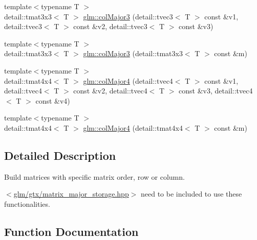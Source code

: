 \begin{DoxyCompactItemize}
\item 
{\footnotesize template$<$typename T $>$ }\\detail\+::tmat3x3$<$ T $>$ \hyperlink{group__gtx__matrix__major__storage_ga025bcabc88eafc950e2f518939dc154e}{glm\+::col\+Major3} (detail\+::tvec3$<$ T $>$ const \&v1, detail\+::tvec3$<$ T $>$ const \&v2, detail\+::tvec3$<$ T $>$ const \&v3)
\item 
{\footnotesize template$<$typename T $>$ }\\detail\+::tmat3x3$<$ T $>$ \hyperlink{group__gtx__matrix__major__storage_ga0766258f7e0ed0a64c38838011b8e4d8}{glm\+::col\+Major3} (detail\+::tmat3x3$<$ T $>$ const \&m)
\item 
{\footnotesize template$<$typename T $>$ }\\detail\+::tmat4x4$<$ T $>$ \hyperlink{group__gtx__matrix__major__storage_ga8f5575ea47a559564dc3bd073082e475}{glm\+::col\+Major4} (detail\+::tvec4$<$ T $>$ const \&v1, detail\+::tvec4$<$ T $>$ const \&v2, detail\+::tvec4$<$ T $>$ const \&v3, detail\+::tvec4$<$ T $>$ const \&v4)
\item 
{\footnotesize template$<$typename T $>$ }\\detail\+::tmat4x4$<$ T $>$ \hyperlink{group__gtx__matrix__major__storage_gad321af5ae6d151fd3752725b06c97154}{glm\+::col\+Major4} (detail\+::tmat4x4$<$ T $>$ const \&m)
\end{DoxyCompactItemize}


\subsection{Detailed Description}
Build matrices with specific matrix order, row or column. 

$<$\hyperlink{matrix__major__storage_8hpp}{glm/gtx/matrix\+\_\+major\+\_\+storage.\+hpp}$>$ need to be included to use these functionalities. 

\subsection{Function Documentation}
\hypertarget{group__gtx__matrix__major__storage_gaa188eb2ad0b0922f251bf1d0f4d85043}{}

